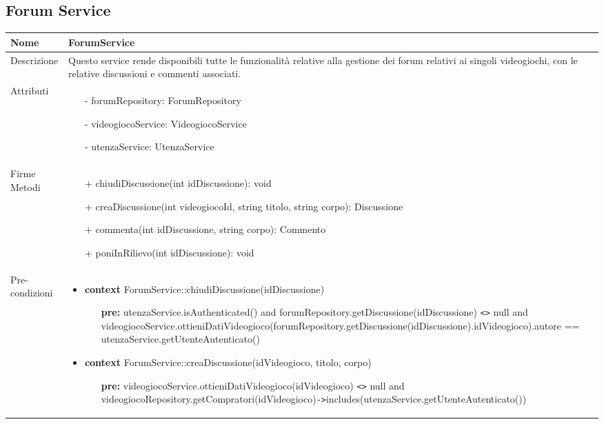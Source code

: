 \subsection{Forum Service}
\small\begin{tabular}{|| l | p{28em} ||} 
	\hline
	Nome & ForumService\\
	\hline
	Descrizione & Questo service rende disponibili tutte le funzionalità relative alla gestione dei forum relativi ai singoli videogiochi, con le relative discussioni e commenti associati. \\
	\hline
	Attributi & \begin{itemize}
		\item[-] forumRepository: ForumRepository
		\item[-] videogiocoService: VideogiocoService
		\item[-] utenzaService: UtenzaService
	\end{itemize}\\
	\hline
	Firme Metodi & \begin{itemize}
		\item[+] chiudiDiscussione(int idDiscussione): void
		\item[+] creaDiscussione(int videogiocoId, string titolo, string corpo): Discussione
		\item[+] commenta(int idDiscussione, string corpo): Commento
		\item[+] poniInRilievo(int idDiscussione): void
	\end{itemize}\\
	\hline
	Pre-condizioni & \begin{itemize}[leftmargin=*]
		\item \textbf{context} ForumService::chiudiDiscussione(idDiscussione)
		\begin{itemize}
			\item[ ] \textbf{pre:} utenzaService.isAuthenticated() and forumRepository.getDiscussione(idDiscussione) \verb|<>| null and videogiocoService\newline .ottieniDatiVideogioco(forumRepository\newline .getDiscussione(idDiscussione).idVideogioco).autore == utenzaService.getUtenteAutenticato()
		\end{itemize}

		\item \textbf{context} ForumService::creaDiscussione(idVideogioco, titolo, corpo)
		\begin{itemize}
			\item[ ] \textbf{pre:} videogiocoService\newline .ottieniDatiVideogioco(idVideogioco) \verb|<>| null and videogiocoRepository\newline .getCompratori(idVideogioco)\verb|->|includes(\newline utenzaService.getUtenteAutenticato())
		\end{itemize}


\end{itemize}
\end{tabular}
